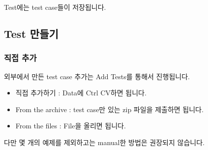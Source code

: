 \documentclass{article}
\begin{document}
    Test에는 test case들이 저장됩니다.
    \subsection{Test 만들기}
    \subsubsection{직접 추가}
    외부에서 만든 test case 추가는 Add Tests를 통해서 진행됩니다. 
    \begin{itemize}
        \item 직접 추가하기 : Data에 Ctrl CV하면 됩니다.
        \item From the archive : test case만 있는 zip 파일을 제출하면 됩니다.
        \item From the files : File을 올리면 됩니다.
    \end{itemize}
    다만 몇 개의 예제를 제외하고는 manual한 방법은 권장되지 않습니다.
\end{document}
